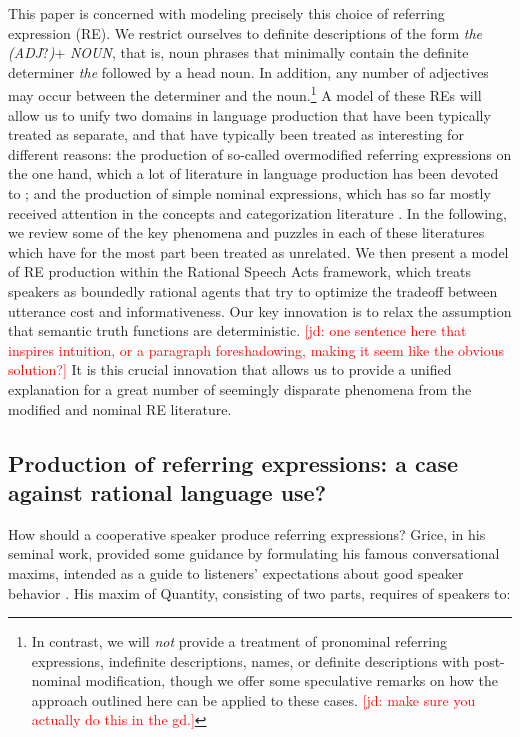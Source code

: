 \documentclass[11pt]{article}
\newcommand{\jd}[1]{\textcolor{Red}{[jd: #1]}}
\begin{document}
This paper is concerned with  modeling precisely this choice of referring expression (RE). We restrict ourselves to definite descriptions of the form \emph{the (ADJ}?\emph{)}+ \emph{NOUN}, that is, noun phrases that minimally contain the definite determiner \emph{the} followed by a head noun. In addition, any number of adjectives may occur between the determiner and the noun.\footnote{In contrast, we will \emph{not} provide a treatment of pronominal referring expressions, indefinite descriptions, names, or definite descriptions with post-nominal modification, though we offer some speculative remarks on how the approach outlined here can be applied to these cases. \jd{make sure you actually do this in the gd.}} A model of these REs will allow us to unify two domains in language production that have been typically treated as separate, and that have typically been treated as interesting for different reasons: the production of so-called overmodified referring expressions on the one hand, which a lot of literature in language production has been devoted to \cite{deutsch, hermann, Pechmann1989, nadig2002,  Maes2004, Engelhardt2006, Arts2011, Koolen2011, rubiofernandez2016}; and the production of simple nominal expressions, which has so far mostly received attention in the concepts and categorization literature \cite{bla bla}. In the following, we review some of the key phenomena and puzzles in each of these literatures which have for the most part been treated as unrelated. We then present a model of RE production within the Rational Speech Acts \cite{frank2012} framework, which treats speakers as boundedly rational agents that try to optimize the tradeoff between utterance cost and  informativeness. Our key innovation is to relax the assumption that semantic truth functions are deterministic. \jd{one sentence here that inspires intuition, or a paragraph foreshadowing, making it seem like the obvious solution?} It is this crucial innovation that allows us to provide a unified explanation for a great number of seemingly disparate phenomena from the modified and nominal RE literature.

\subsection{Production of referring expressions: a case against rational language use?}

How should a cooperative speaker produce referring expressions? Grice, in his seminal work, provided some guidance by formulating his famous conversational maxims, intended as a guide to listeners' expectations about good speaker behavior \cite{grice1975}. His maxim of Quantity, consisting of two parts, requires of speakers to:
\end{document}
